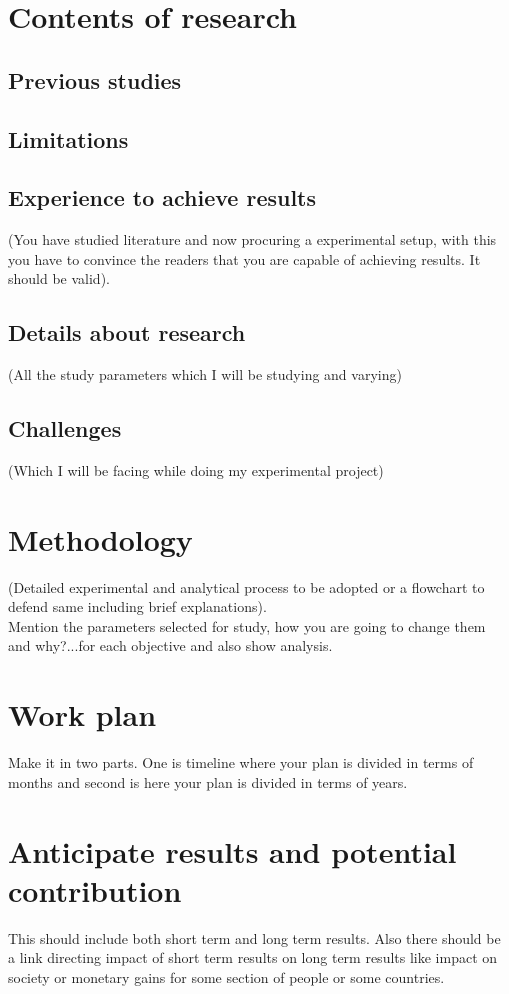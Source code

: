 \documentclass[10pt,a4paper]{article}
\begin{document}
\section{Contents of research}
\subsection{Previous studies}
\subsection{Limitations}
\subsection{Experience to achieve results}
(You have studied literature and now procuring a experimental setup, with this you have to convince the readers that you are capable of achieving results. It should be valid).
\subsection{Details about research}
(All the study parameters which I will be studying and varying)
\subsection{Challenges}
(Which I will be facing while doing my experimental project)
\clearpage
\section{Methodology}
(Detailed experimental and analytical process to be adopted or a flowchart to defend same including brief explanations).\\
Mention the parameters selected for study, how you are going to change them and why?...for each objective and also show analysis.
\section{Work plan}
Make it in two parts. One is timeline where your plan is divided in terms of months and second is here your plan is divided in terms of years.
\section{Anticipate results and potential contribution}
This should include both short term and long term results. Also there should be a link directing impact of short term results on long term results like impact on society or monetary gains for some section of people or some countries.

\printbibliography[heading=bibintoc]
\end{document}
